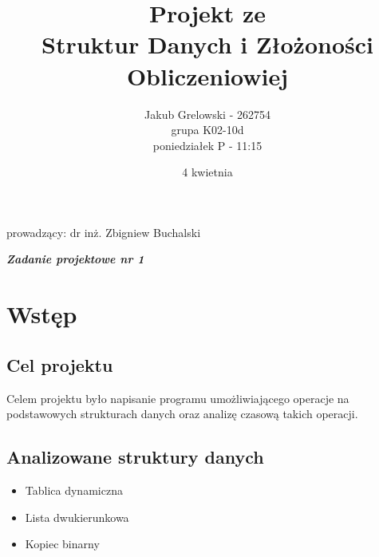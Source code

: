 \documentclass{article}
\title{\vspace{4cm} \textbf{Projekt ze \\ Struktur Danych i Złożoności Obliczeniowiej}}
\author{Jakub Grelowski - 262754 \\
        grupa K02-10d \\
        poniedziałek P - 11:15}
\date{4 kwietnia}
\begin{document}
\maketitle

\begin{center}

\large prowadzący: dr inż. Zbigniew Buchalski 

\vspace{1cm}

\Large \textbf{\textit{Zadanie projektowe nr 1}}     
\end{center}

\vspace{1cm}

\newpage

\tableofcontents

\newpage

\section{Wstęp}

\subsection{Cel projektu}
Celem projektu było napisanie programu umożliwiającego operacje na podstawowych strukturach danych oraz analizę czasową takich operacji. 

\subsection{Analizowane struktury danych}

\begin{itemize}
    \item Tablica dynamiczna
    \item Lista dwukierunkowa 
    \item Kopiec binarny
\end{itemize}
\end{document}
